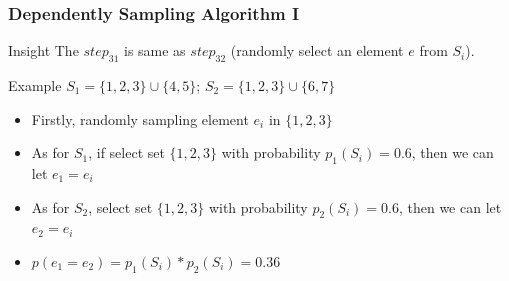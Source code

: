 \documentclass[notheorems, aspectratio=54]{beamer}
\begin{document}
\begin{frame}
    \frametitle{Dependently Sampling Algorithm I}
    \begin{block}{Insight}
        The $step_{31}$ is same as $step_{32}$ (randomly select an element $e$ from $S_i$).
    \end{block}
    \begin{block}{Example}
        $S_1 =  \{1,2,3\} \cup \{4,5\}$; $S_2 = \{1,2,3\} \cup \{6,7\}$
        \begin{itemize}
            \item Firstly, randomly sampling element $e_i$ in $\{1,2,3\}$
            \item As for $S_1$, if select set $\{1,2,3\}$ with probability $p_1(S_i)=0.6$, then we can let $e_1 = e_i$
            \item As for $S_2$, select set $\{1,2,3\}$ with probability $p_2(S_i)=0.6$, then we can let $e_2 = e_i$
            \item $p(e_1 = e_2) = p_1(S_i)*p_2(S_i) = 0.36$
        \end{itemize}
    \end{block}
\end{frame}
\end{document}
